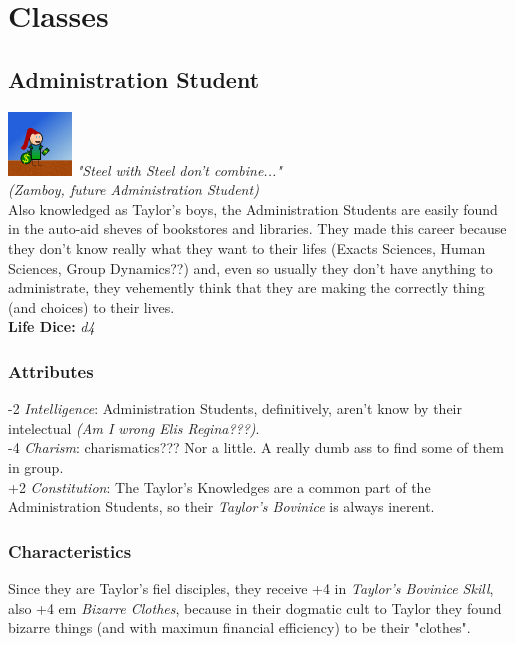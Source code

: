 \documentclass[ letterpaper,12pt]{article}
\begin{document}
\section{Classes}

\subsection{Administration Student}
\includegraphics{../data/classes/Img/administracao.png}
{\it "Steel with Steel don't combine..."\\(Zamboy, future Administration Student)}\\

Also knowledged as Taylor's boys, the Administration Students are easily found
in the auto-aid sheves of bookstores and libraries. They made this career
because they don't know really what they want to their lifes (Exacts Sciences,
Human Sciences, Group Dynamics??) and, even so usually they don't have anything
to administrate, they vehemently think that they are making the correctly thing
(and choices) to their lives.\\ 

{\bf Life Dice:} {\it d4}

\subsubsection{Attributes}
-2 {\it Intelligence}: Administration Students, definitively,  aren't know by their intelectual {\it (Am I wrong Elis Regina???)}.\\
-4 {\it Charism}: charismatics??? Nor a little. A really dumb ass to find some of them in group.\\
+2 {\it Constitution}: The Taylor's Knowledges are a common part of the Administration Students, so their {\it Taylor's Bovinice} is always inerent.


\subsubsection{Characteristics}
Since they are Taylor's fiel disciples, they receive +4 in {\it Taylor's Bovinice Skill}, also +4 em {\it Bizarre Clothes}, because in their dogmatic cult to Taylor they found bizarre things (and with maximun financial efficiency) to be their "clothes". \\
\end{document}
